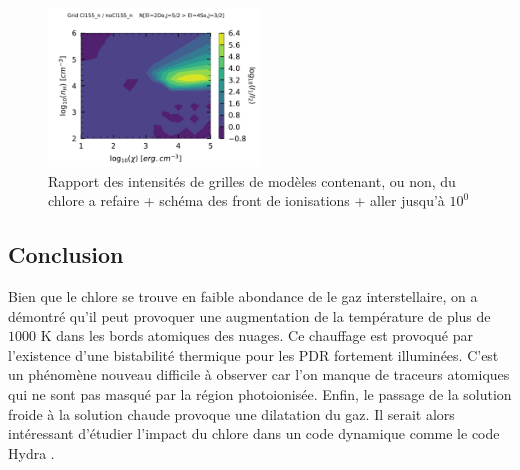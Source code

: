 \begin{figure}[!h]
    \centering \includegraphics[trim = {0 0 0 1cm},clip,width=0.5\textwidth]{figure/Cl/gridModelEmiss/map_Cl155_n_noCl155_nI_N.pdf}
    \caption{Rapport des intensités de grilles de modèles contenant, ou non, du chlore a refaire + schéma des front de ionisations + aller jusqu'à $10^0$}
    \label{fig:Cl:gridModelEmiss:N}
\end{figure}


\subsection*{Conclusion}

Bien que le chlore se trouve en faible abondance de le gaz interstellaire, on a démontré qu'il peut provoquer une augmentation de la température de plus de $1000$ K dans les bords atomiques des nuages. Ce chauffage est provoqué par l'existence d'une bistabilité thermique pour les PDR fortement illuminées. C'est un phénomène nouveau difficile à observer car l'on manque de traceurs atomiques qui ne sont pas masqué par la région photoionisée. Enfin, le passage de la solution froide à la solution chaude provoque une dilatation du gaz. Il serait alors intéressant d'étudier l'impact du chlore dans un code dynamique comme le code Hydra \cite{Bron2018}.







